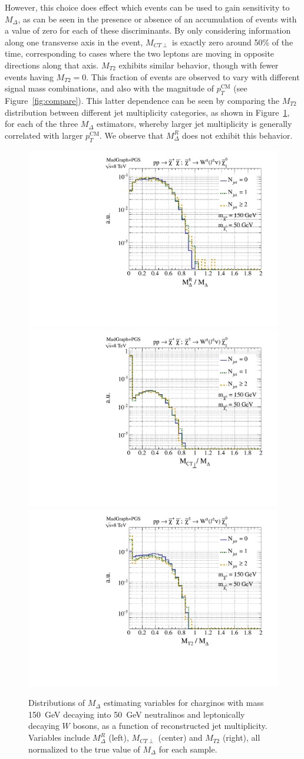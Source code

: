 However, this choice does effect which events can be used to gain sensitivity to $M_{\Delta}$, as can be seen in the presence or absence of an accumulation of events with a value of zero for each of these discriminants. By only considering information along one transverse axis in the event, $M_{CT\perp}$ is exactly zero around 50\% of the time, corresponding to cases where the two leptons are moving in opposite directions along that axis. $M_{T2}$ exhibits similar behavior, though with fewer events having $M_{T2} = 0$. This fraction of events are observed to vary with different signal mass combinations, and also with the magnitude of $p_{T}^\text{CM}$ (see Figure~\ref{fig:compare}). This latter dependence can be seen by comparing the $M_{T2}$ distribution between different jet multiplicity categories, as shown in Figure~\ref{fig:compare_njet}, for each of the three $M_{\Delta}$ estimators, whereby larger jet multiplicity is generally correlated with larger $p_{T}^\text{CM}$. We observe that $M_{\Delta}^{R}$ does not exhibit this behavior.

\begin{figure}[ht]
\includegraphics[width=0.3\columnwidth]{fig/sectionIII/Mdelta_norm_Njet_log_chargino.pdf}
\includegraphics[width=0.3\columnwidth]{fig/sectionIII/MCTperp_norm_Njet_log_chargino.pdf} 
\includegraphics[width=0.3\columnwidth]{fig/sectionIII/MT2_norm_Njet_log_chargino.pdf} 
\caption{Distributions of $M_{\Delta}$ estimating variables for charginos with mass 150~GeV decaying into 50~GeV neutralinos and leptonically decaying $W$ bosons, as a function of reconstructed jet multiplicity. Variables include $M_{\Delta}^{R}$ (left), $M_{CT\perp}$ (center) and $M_{T2}$ (right), all normalized to the true value of $M_{\Delta}$ for each sample. \label{fig:compare_njet}}
\end{figure}


